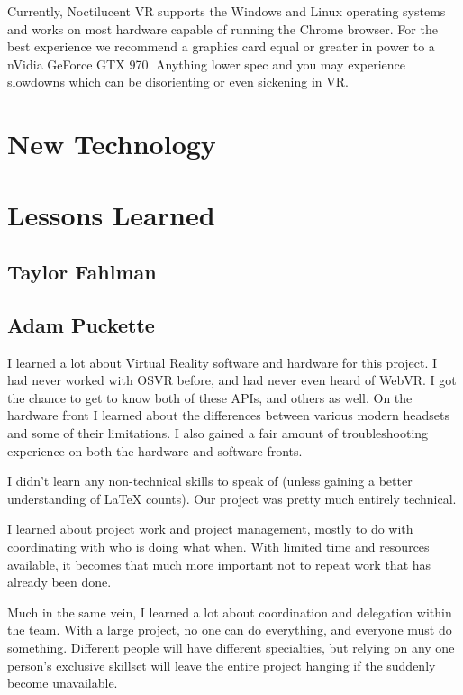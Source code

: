 \documentclass[draftclsnofoot,onecolumn]{IEEEtran}
\begin{document}
Currently, Noctilucent VR supports the Windows and Linux operating systems and works on most hardware capable of running the Chrome browser. 
For the best experience we recommend a graphics card equal or greater in power to a nVidia GeForce GTX 970. 
Anything lower spec and you may experience slowdowns which can be disorienting or even sickening in VR. 

\section{New Technology}

\section{Lessons Learned}

\subsection{Taylor Fahlman}

\subsection{Adam Puckette}

I learned a lot about Virtual Reality software and hardware for this project. 
I had never worked with OSVR before, and had never even heard of WebVR. 
I got the chance to get to know both of these APIs, and others as well. 
On the hardware front I learned about the differences between various modern headsets and some of their limitations. 
I also gained a fair amount of troubleshooting experience on both the hardware and software fronts.

I didn't learn any non-technical skills to speak of (unless gaining a better understanding of LaTeX counts). Our project was pretty much entirely technical.

I learned about project work and project management, mostly to do with coordinating with who is doing what when. 
With limited time and resources available, it becomes that much more important not to repeat work that has already been done. 

Much in the same vein, I learned a lot about coordination and delegation within the team. 
With a large project, no one can do everything, and everyone must do something. 
Different people will have different specialties, but relying on any one person's exclusive skillset will leave the entire project hanging if the suddenly become unavailable. 
\end{document}
